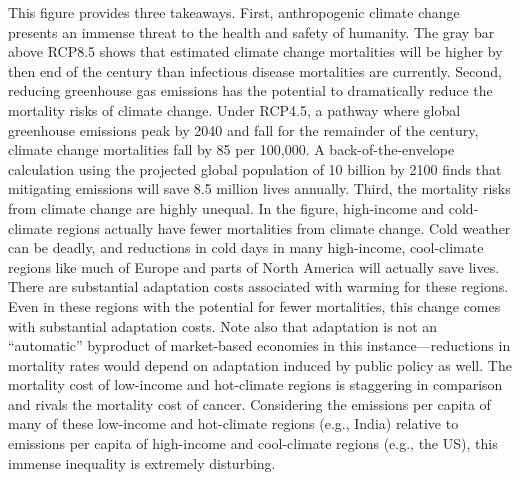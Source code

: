 This figure provides three takeaways. First, anthropogenic climate change presents an immense threat to the health and safety of humanity. The gray bar above RCP8.5 shows that estimated climate change mortalities will be higher by then end of the century than infectious disease mortalities are currently. Second, reducing greenhouse gas emissions has the potential to dramatically reduce the mortality risks of climate change. Under RCP4.5, a pathway where global greenhouse emissions peak by 2040 and fall for the remainder of the century, climate change mortalities fall by 85 per 100,000. A  back-of-the-envelope calculation using the projected global population of 10 billion by 2100 finds that mitigating emissions will save 8.5 million lives annually. Third, the mortality risks from climate change are highly unequal. In the figure, high-income and cold-climate regions actually have fewer mortalities from climate change. Cold weather can be deadly, and reductions in cold days in many high-income, cool-climate regions like much of Europe and parts of North America will actually save lives. There are substantial adaptation costs associated with warming for these regions. Even in these regions with the potential for fewer mortalities, this change comes with substantial adaptation costs. Note also that adaptation is not an ``automatic'' byproduct of market-based economies in this instance---reductions in mortality rates would depend on adaptation induced by public policy as well. The mortality cost of low-income and hot-climate regions is staggering in comparison and rivals the mortality cost of cancer. Considering the emissions per capita of many of these low-income and hot-climate regions (e.g., India) relative to emissions per capita of high-income and cool-climate regions (e.g., the US), this immense inequality is extremely disturbing. 

